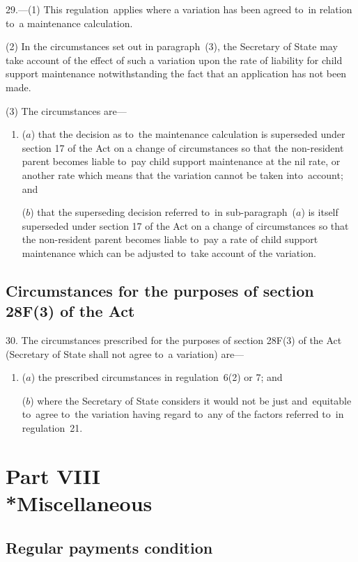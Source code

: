 \documentclass[12pt,a4paper]{article}
\begin{document}
29.---(1)  This regulation~applies where a variation has been agreed to~in relation to~a maintenance calculation.

(2) In the circumstances set out in paragraph~(3), the Secretary of State may take account of the effect of such a variation upon the rate of liability for child support maintenance notwithstanding the fact that an application has not been made.

(3) The circumstances are—
\begin{enumerate}\item[]
($a$) that the decision as to~the maintenance calculation is superseded under section 17 of the Act on a change of circumstances so that the non-resident parent becomes liable to~pay child support maintenance at the nil rate, or another rate which means that the variation cannot be taken into~account; and

($b$) that the superseding decision referred to~in sub-paragraph~($a$)  is itself superseded under section 17 of the Act on a change of circumstances so that the non-resident parent becomes liable to~pay a rate of child support maintenance which can be adjusted to~take account of the variation.
\end{enumerate}

\subsection[30. Circumstances for the purposes of section 28F(3) of the Act]{Circumstances for the purposes of section 28F(3) of the Act}

30.  The circumstances prescribed for the purposes of section 28F(3) of the Act (Secretary of State shall not agree to~a variation) are—
\begin{enumerate}\item[]
($a$) the prescribed circumstances in regulation~6(2) or 7; and

($b$) where the Secretary of State considers it would not be just and~equitable to~agree to~the variation having regard to~any of the factors referred to~in regulation~21.
\end{enumerate}

\section[Part VIII --- Miscellaneous]{Part VIII\\*Miscellaneous}

\subsection[31. Regular payments condition]{Regular payments condition}
\end{document}
